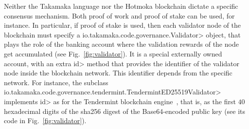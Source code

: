 Neither the Takamaka language nor the Hotmoka blockchain dictate a specific consensus mechanism.
Both proof of work and proof of stake can be used, for instance. In particular, if proof of stake
is used, then each validator node of the blockchain must specify a
\<io.takamaka.code.governance.Validator> object, that plays the role of the
banking account where the validation rewards of the node get accumulated (see Fig.~\ref{fig:validator}).
It is a special externally owned account, with an extra \<id> method that provides the
identifier of the validator node inside the blockchain network. This identifier depends from the
specific network.
For instance, the subclass
\<io.takamaka.code.governance.tendermint.Tender\-mintED25519Validator>
implements \<id> as for the Tendermint blockchain engine~\cite{Kwon14},
that is,
as the first $40$ hexadecimal digits of the sha256 digest of the Base64-encoded public key
(see its code in Fig.~\ref{fig:validator}).
